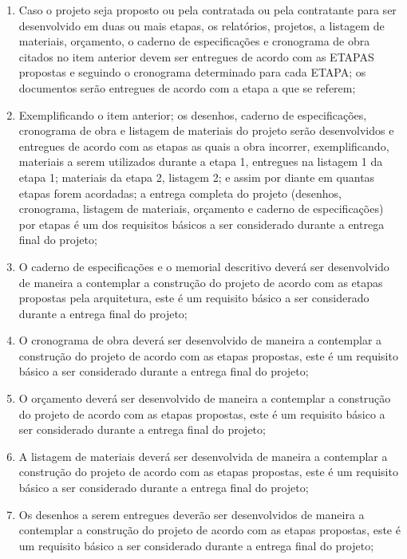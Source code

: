 \begin{enumerate}
	\item Caso o projeto seja proposto ou pela contratada ou pela contratante para ser desenvolvido em duas ou mais etapas, os relatórios, projetos, a listagem de materiais, orçamento, o caderno de especificações e cronograma de obra citados no item anterior devem ser entregues de acordo com as ETAPAS propostas e seguindo o cronograma determinado para cada ETAPA; os documentos serão entregues de acordo com a etapa a que se referem;
	
	\item Exemplificando o item anterior; os desenhos, caderno de especificações, cronograma de obra e listagem de materiais do projeto serão desenvolvidos e entregues de acordo com as etapas as quais a obra incorrer, exemplificando, materiais a serem utilizados durante a etapa 1, entregues na listagem 1 da etapa 1; materiais da etapa 2, listagem 2; e assim por diante em quantas etapas forem acordadas; a entrega completa do projeto (desenhos, cronograma, listagem de materiais, orçamento e caderno de especificações) por etapas é um dos requisitos básicos a ser considerado durante a entrega final do projeto;
	
	\item O caderno de especificações e o memorial descritivo deverá ser desenvolvido de maneira a contemplar a construção do projeto de acordo com as etapas propostas pela arquitetura, este é um requisito básico a ser considerado durante a entrega final do projeto;
	
	\item O cronograma de obra deverá ser desenvolvido de maneira a contemplar a construção do projeto de acordo com as etapas propostas, este é um requisito básico a ser considerado durante a entrega final do projeto;
	
	\item O orçamento deverá ser desenvolvido de maneira a contemplar a construção do projeto de acordo com as etapas propostas, este é um requisito básico a ser considerado durante a entrega final do projeto;
	
	\item A listagem de materiais deverá ser desenvolvida de maneira a contemplar a construção do projeto de acordo com as etapas propostas, este é um requisito básico a ser considerado durante a entrega final do projeto;
	
	\item Os desenhos a serem entregues deverão ser desenvolvidos de maneira a contemplar a construção do projeto de acordo com as etapas propostas, este é um requisito básico a ser considerado durante a entrega final do projeto;
	

\end{enumerate}
